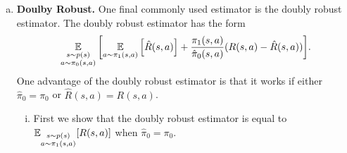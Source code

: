 \documentclass[12pt,letterpaper,boxed]{hmcpset}
\begin{document}
\begin{solution}
\begin{enumerate}[(a)]
    \begin{proof}
      When there is only a single data element $(s^*, a^*, R(s^*,a^*))$ in the observational dataset, we have
      \[
      \begin{aligned}
        & \E_{\substack{s \sim p(s) \\ a \sim \pi_0 (s,a)}}\qty[\frac{\pi_1(s,a)}{\hat \pi_0 (s,a)} R(s,a)] = \frac{\pi_1(s,a)}{\hat \pi_0 (s,a)} R(s^*,a^*), \\
        & \E_{\substack{s \sim p(s) \\ a \sim \pi_0 (s,a)}} \qty[\frac{\pi_1(s,a)}{\hat \pi_0 (s,a)}] = \frac{\pi_1(s,a)}{\hat \pi_0 (s,a)}.
      \end{aligned}
      \]
      The weighted importance estimator then gives
      \[
        \frac{\E_{\substack{s \sim p(s) \\ a \sim \pi_0 (s,a)}}\qty[\frac{\pi_1(s,a)}{\hat \pi_0 (s,a)} R(s,a)] }{ \E_{\substack{s \sim p(s) \\ a \sim \pi_0 (s,a)}}\qty[\frac{\pi_1(s,a)}{\hat \pi_0 (s,a)}] } = R(s^*,a^*) = \E_{\substack{s \sim p(s) \\ a \sim \pi_0 (s,a)}} [R(s,a)].
      \]
      If $\pi_1 \neq \pi_0$, that is, if $pi_1$ has nonzero probability taking any action $a \neq a^*$ at state $s^*$, then the weighted importance sampling estimator
      \[
        \frac{\E_{\substack{s \sim p(s) \\ a \sim \pi_0 (s,a)}}\qty[\frac{\pi_1(s,a)}{\hat \pi_0 (s,a)} R(s,a)] }{ \E_{\substack{s \sim p(s) \\ a \sim \pi_0 (s,a)}}\qty[\frac{\pi_1(s,a)}{\hat \pi_0 (s,a)}] } = \E_{\substack{s \sim p(s) \\ a \sim \pi_0 (s,a)}} [R(s,a)] \neq \E_{\substack{s \sim p(s) \\ a \sim \pi_1 (s,a)}} [R(s,a)],
      \]
      causing a bias.
    \end{proof}

    \item \textbf{Doulby Robust.} One final commonly used estimator is the doubly robust estimator. The doubly robust estimator has the form 
      \[
      \operatorname*{\mathbb{E}}_{\substack{s \sim p(s) \\ a \sim \pi_0(s,a)}} \qty[ \operatorname*{\mathbb{E}}_{a \sim \pi_1(s,a)} \qty[\hat R(s,a)] + \frac{\pi_1(s,a)}{\hat \pi_0 (s,a)} (R(s,a) - \hat R(s,a)) ].
      \]
      One advantage of the doubly robust estimator is that it works if either $\hat \pi_0 = \pi_0$ or $\hat R(s,a) = R(s,a)$.
      \begin{enumerate}[i.]
        \item First we show that the doubly robust estimator is equal to $\operatorname*{\mathbb{E}}_{\substack{s \sim p(s) \\ a \sim \pi_1(s,a)}} [R(s,a)]$ when $\hat \pi_0 = \pi_0$.
        

\end{enumerate}
\end{enumerate}
\end{solution}
\end{document}

